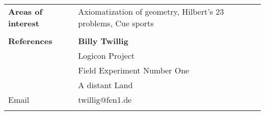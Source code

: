 \documentclass[12pt, a4paper]{article}
\begin{document}
\begin{longtable}{@{} p{} >{\RaggedRight}p{}}
  \textcolor{midblue}{\textbf{Areas of interest}}
  & Axiomatization of geometry, Hilbert's 23 problems,
  Cue sports \\
  & \\

  \newpage

  \textcolor{midblue}{\textbf{References}}
  & \textbf{Billy Twillig} \\
  & Logicon Project \\
  & Field Experiment Number One \\
  & A distant Land \\
  Email
  & twillig@fen1.de \\
  & \\

\end{longtable}
\end{document}
